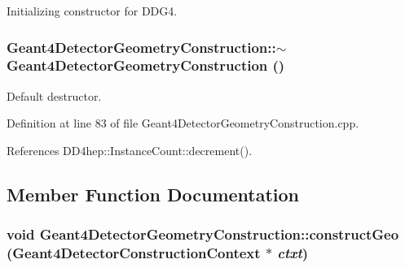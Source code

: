 Initializing constructor for DDG4. \hypertarget{class_d_d4hep_1_1_simulation_1_1_geant4_detector_geometry_construction_ad0f9d21253bd2cf44ce3ce56b52838b7}{
\subsubsection[{$\sim$Geant4DetectorGeometryConstruction}]{\setlength{\rightskip}{0pt plus 5cm}Geant4DetectorGeometryConstruction::$\sim$Geant4DetectorGeometryConstruction ()}}
\label{class_d_d4hep_1_1_simulation_1_1_geant4_detector_geometry_construction_ad0f9d21253bd2cf44ce3ce56b52838b7}


Default destructor. 

Definition at line 83 of file Geant4DetectorGeometryConstruction.cpp.

References DD4hep::InstanceCount::decrement().

\subsection{Member Function Documentation}
\hypertarget{class_d_d4hep_1_1_simulation_1_1_geant4_detector_geometry_construction_ab20b86bfe9009f93ce567ef418e266af}{
\subsubsection[{constructGeo}]{\setlength{\rightskip}{0pt plus 5cm}void Geant4DetectorGeometryConstruction::constructGeo ({\bf Geant4DetectorConstructionContext} $\ast$ {\em ctxt})}}
\label{class_d_d4hep_1_1_simulation_1_1_geant4_detector_geometry_construction_ab20b86bfe9009f93ce567ef418e266af}


